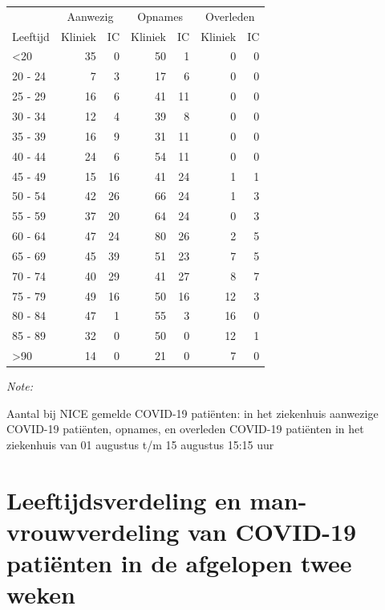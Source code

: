 \documentclass[
  english,
  man,floatsintext]{apa6}
\begin{document}
\begin{table}
\centering\begingroup\fontsize{10}{12}\selectfont

\begin{threeparttable}
\begin{tabular}{lrrrrrr}
\toprule
\multicolumn{1}{c}{ } & \multicolumn{2}{c}{Aanwezig} & \multicolumn{2}{c}{Opnames} & \multicolumn{2}{c}{Overleden} \\
\cmidrule(l{3pt}r{3pt}){2-3} \cmidrule(l{3pt}r{3pt}){4-5} \cmidrule(l{3pt}r{3pt}){6-7}
Leeftijd & Kliniek & IC & Kliniek & IC & Kliniek & IC\\
\midrule
<20 & 35 & 0 & 50 & 1 & 0 & 0\\
20 - 24 & 7 & 3 & 17 & 6 & 0 & 0\\
25 - 29 & 16 & 6 & 41 & 11 & 0 & 0\\
30 - 34 & 12 & 4 & 39 & 8 & 0 & 0\\
35 - 39 & 16 & 9 & 31 & 11 & 0 & 0\\
40 - 44 & 24 & 6 & 54 & 11 & 0 & 0\\
45 - 49 & 15 & 16 & 41 & 24 & 1 & 1\\
50 - 54 & 42 & 26 & 66 & 24 & 1 & 3\\
55 - 59 & 37 & 20 & 64 & 24 & 0 & 3\\
60 - 64 & 47 & 24 & 80 & 26 & 2 & 5\\
65 - 69 & 45 & 39 & 51 & 23 & 7 & 5\\
70 - 74 & 40 & 29 & 41 & 27 & 8 & 7\\
75 - 79 & 49 & 16 & 50 & 16 & 12 & 3\\
80 - 84 & 47 & 1 & 55 & 3 & 16 & 0\\
85 - 89 & 32 & 0 & 50 & 0 & 12 & 1\\
>90 & 14 & 0 & 21 & 0 & 7 & 0\\
\bottomrule
\end{tabular}
\begin{tablenotes}
\item \textit{Note: } 
\item Aantal bij NICE gemelde COVID-19 patiënten: in het ziekenhuis aanwezige COVID-19 patiënten, opnames, en overleden COVID-19 patiënten in het ziekenhuis van 01 augustus t/m 15 augustus 15:15 uur
\end{tablenotes}
\end{threeparttable}
\endgroup{}
\end{table}

\newpage

\hypertarget{leeftijdsverdeling-en-man-vrouwverdeling-van-covid-19-patiuxebnten-in-de-afgelopen-twee-weken}{%
\section{Leeftijdsverdeling en man-vrouwverdeling van COVID-19 patiënten in de afgelopen twee weken}\label{leeftijdsverdeling-en-man-vrouwverdeling-van-covid-19-patiuxebnten-in-de-afgelopen-twee-weken}}
\end{document}
